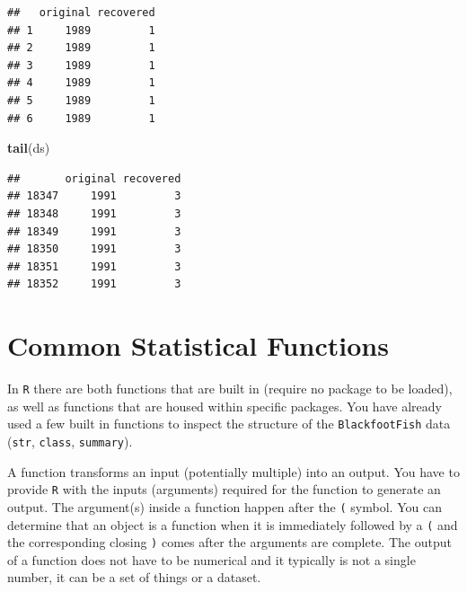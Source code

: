 \documentclass[
  10pt,
  letterpaper,
  twoside,
  openright]{book}
\newenvironment{Shaded}{\begin{snugshade}}{\end{snugshade}}
\newcommand{\AttributeTok}[1]{\textcolor[rgb]{0.13,0.29,0.53}{#1}}
\newcommand{\FunctionTok}[1]{\textcolor[rgb]{0.13,0.29,0.53}{\textbf{#1}}}
\newcommand{\NormalTok}[1]{#1}
\newcommand{\OtherTok}[1]{\textcolor[rgb]{0.56,0.35,0.01}{#1}}
\newcommand{\SpecialCharTok}[1]{\textcolor[rgb]{0.81,0.36,0.00}{\textbf{#1}}}
\begin{document}
\begin{Shaded}
\end{Shaded}

\begin{verbatim}
##   original recovered
## 1     1989         1
## 2     1989         1
## 3     1989         1
## 4     1989         1
## 5     1989         1
## 6     1989         1
\end{verbatim}

\begin{Shaded}
\begin{Highlighting}[]
\FunctionTok{tail}\NormalTok{(ds)}
\end{Highlighting}
\end{Shaded}

\begin{verbatim}
##       original recovered
## 18347     1991         3
## 18348     1991         3
## 18349     1991         3
## 18350     1991         3
## 18351     1991         3
## 18352     1991         3
\end{verbatim}

\hypertarget{common-statistical-functions}{%
\section{Common Statistical
Functions}\label{common-statistical-functions}}

In \texttt{R} there are both functions that are built in (require no
package to be loaded), as well as functions that are housed within
specific packages. You have already used a few built in functions to
inspect the structure of the \texttt{BlackfootFish} data (\texttt{str},
\texttt{class}, \texttt{summary}).

A function transforms an input (potentially multiple) into an output.
You have to provide \texttt{R} with the inputs (arguments) required for
the function to generate an output. The argument(s) inside a function
happen after the \texttt{(} symbol. You can determine that an object is
a function when it is immediately followed by a \texttt{(} and the
corresponding closing \texttt{)} comes after the arguments are complete.
The output of a function does not have to be numerical and it typically
is not a single number, it can be a set of things or a dataset.
\end{document}
